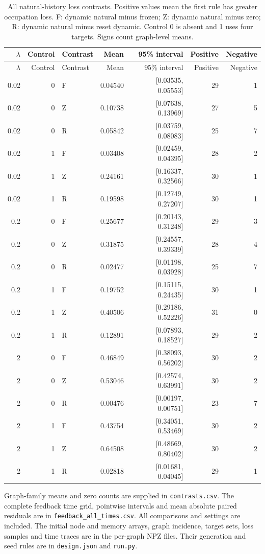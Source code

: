 \documentclass[preprint,11pt,sort&compress]{elsarticle}
\begin{document}
\begin{longtable}{rrlrrrr}
\caption{All natural-history loss contrasts. Positive values mean the first rule has greater occupation loss. F: dynamic natural minus frozen; Z: dynamic natural minus zero; R: dynamic natural minus reset dynamic. Control 0 is absent and 1 uses four targets. Signs count graph-level means.}\label{tab:natural_memory_all}\\
\toprule $\lambda$ & Control & Contrast & Mean & 95\% interval & Positive & Negative\\\midrule\endfirsthead
\toprule $\lambda$ & Control & Contrast & Mean & 95\% interval & Positive & Negative\\\midrule\endhead
0.02 & 0 & F & 0.04540 & [0.03535, 0.05553] & 29 & 1\\
0.02 & 0 & Z & 0.10738 & [0.07638, 0.13969] & 27 & 5\\
0.02 & 0 & R & 0.05842 & [0.03759, 0.08083] & 25 & 7\\
0.02 & 1 & F & 0.03408 & [0.02459, 0.04395] & 28 & 2\\
0.02 & 1 & Z & 0.24161 & [0.16337, 0.32566] & 30 & 1\\
0.02 & 1 & R & 0.19598 & [0.12749, 0.27207] & 30 & 1\\
0.2 & 0 & F & 0.25677 & [0.20143, 0.31248] & 29 & 3\\
0.2 & 0 & Z & 0.31875 & [0.24557, 0.39339] & 28 & 4\\
0.2 & 0 & R & 0.02477 & [0.01198, 0.03928] & 25 & 7\\
0.2 & 1 & F & 0.19752 & [0.15115, 0.24435] & 30 & 1\\
0.2 & 1 & Z & 0.40506 & [0.29186, 0.52226] & 31 & 0\\
0.2 & 1 & R & 0.12891 & [0.07893, 0.18527] & 29 & 2\\
2 & 0 & F & 0.46849 & [0.38093, 0.56202] & 30 & 2\\
2 & 0 & Z & 0.53046 & [0.42574, 0.63991] & 30 & 2\\
2 & 0 & R & 0.00476 & [0.00197, 0.00751] & 23 & 7\\
2 & 1 & F & 0.43754 & [0.34051, 0.53469] & 30 & 2\\
2 & 1 & Z & 0.64508 & [0.48669, 0.80402] & 30 & 2\\
2 & 1 & R & 0.02818 & [0.01681, 0.04045] & 29 & 1\\
\bottomrule\end{longtable}
Graph-family means and zero counts are supplied in \texttt{contrasts.csv}. The complete feedback time grid, pointwise intervals and mean absolute paired residuals are in \texttt{feedback\_all\_times.csv}. All comparisons and settings are included. The initial node and memory arrays, graph incidence, target sets, loss samples and time traces are in the per-graph NPZ files. Their generation and seed rules are in \texttt{design.json} and \texttt{run.py}.
\end{document}
